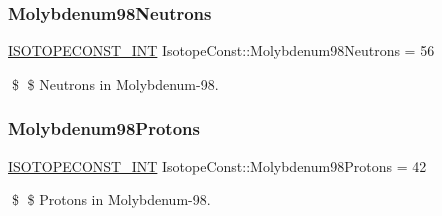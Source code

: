 \subsubsection{\texorpdfstring{Molybdenum98\+Neutrons}{Molybdenum98Neutrons}}
{\footnotesize\ttfamily \mbox{\hyperlink{group___isotope_const-_macros_ga5f18360b3e99483a35c32d789e62621c}{I\+S\+O\+T\+O\+P\+E\+C\+O\+N\+S\+T\+\_\+\+I\+NT}} Isotope\+Const\+::\+Molybdenum98\+Neutrons = 56}

\$ \$ Neutrons in Molybdenum-\/98. \mbox{\label{group___isotope_const-_molybdenum-_mo98_gadfc972fffe1b1a956fc67b76ddd4eefa}} 
\subsubsection{\texorpdfstring{Molybdenum98\+Protons}{Molybdenum98Protons}}
{\footnotesize\ttfamily \mbox{\hyperlink{group___isotope_const-_macros_ga5f18360b3e99483a35c32d789e62621c}{I\+S\+O\+T\+O\+P\+E\+C\+O\+N\+S\+T\+\_\+\+I\+NT}} Isotope\+Const\+::\+Molybdenum98\+Protons = 42}

\$ \$ Protons in Molybdenum-\/98. 